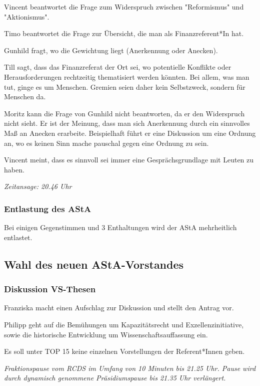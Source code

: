 \documentclass[ngerman,headheight=70pt]{scrartcl}
\begin{document}
    Vincent beantwortet die Frage zum Widerspruch zwischen "Reformismus"
    und "Aktionismus".

    Timo beantwortet die Frage zur Übersicht, die man als Finanzreferent*In
    hat.

    Gunhild fragt, wo die Gewichtung liegt (Anerkennung oder Anecken).

    Till sagt, dass das Finanzreferat der Ort sei, wo potentielle Konflikte
    oder Herausforderungen rechtzeitig thematisiert werden könnten.
    Bei allem, was man tut, ginge es um Menschen. Gremien seien daher kein
    Selbstzweck, sondern für Menschen da.

    Moritz kann die Frage von Gunhild nicht beantworten, da er den Widerspruch
    nicht sieht. Er ist der Meinung, dass man sich Anerkennung durch ein sinnvolles
    Maß an Anecken erarbeite.
    Beispielhaft führt er eine Diskussion um eine Ordnung an, wo es keinen Sinn
    mache pauschal gegen eine Ordnung zu sein.

    Vincent meint, dass es sinnvoll sei immer eine Gesprächsgrundlage mit
    Leuten zu haben.

    \textit{Zeitansage: 20.46 Uhr}

    \subsubsection{Entlastung des AStA}

    Bei einigen Gegenstimmen und 3 Enthaltungen wird der AStA
    mehrheitlich entlastet.

    \subsection{Wahl des neuen AStA-Vorstandes}

    \subsubsection{Diskussion VS-Thesen}

    Franziska macht einen Aufschlag zur Diskussion und stellt
    den Antrag vor.

    Philipp geht auf die Bemühungen um Kapazitätsrecht und Exzellenzinitiative,
    sowie die historische Entwicklung um Wissenschaftsauffassung ein.

    Es soll unter TOP 15 keine einzelnen Vorstellungen der Referent*Innen geben.

    \textit{Fraktionspause vom RCDS im Umfang von 10 Minuten bis 21.25 Uhr.
    Pause wird durch dynamisch genommene Präsidiumspause bis 21.35 Uhr
    verlängert.}
\end{document}
